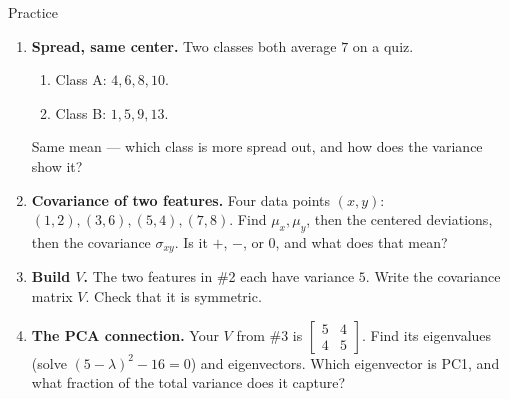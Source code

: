 \documentclass[10pt]{article}
\begin{document}
\begin{notesbox}{Practice}
\begin{enumerate}[leftmargin=1.9em, itemsep=11pt]
  \item \textbf{Spread, same center.} Two classes both average $7$ on a quiz.
    \begin{enumerate}[label=(\alph*), leftmargin=1.8em, itemsep=4pt]
      \item Class A: $4,6,8,10$. \hfill {}
      \item Class B: $1,5,9,13$. \hfill {}
    \end{enumerate}
    Same mean --- which class is more spread out, and how does the variance show it? 
  \item \textbf{Covariance of two features.} Four data points $(x,y)$: $(1,2),(3,6),(5,4),(7,8)$.
        Find $\mu_x,\mu_y$, then the centered deviations, then the covariance $\sigma_{xy}$. Is it $+$, $-$, or $0$,
        and what does that mean? 
  \item \textbf{Build $V$.} The two features in \#2 each have variance $5$. Write the covariance matrix $V$.
        Check that it is symmetric. 
  \item \textbf{The PCA connection.} Your $V$ from \#3 is $\left[\begin{smallmatrix}5&4\\4&5\end{smallmatrix}\right]$.
        Find its eigenvalues (solve $(5-\lambda)^2-16=0$) and eigenvectors. Which eigenvector is PC1, and what
        fraction of the total variance does it capture? 

\end{enumerate}
\end{notesbox}
\end{document}

